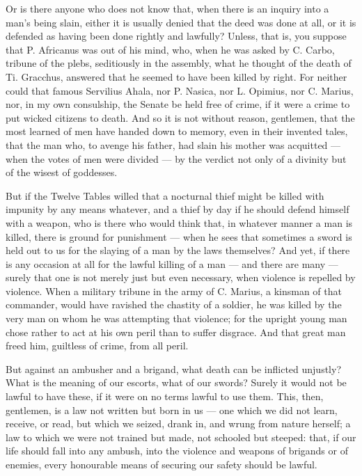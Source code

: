  Or is there anyone who does not know that, when there is an inquiry into a man's being slain, either it is usually denied that the deed was done at all, or it is defended as having been done rightly and lawfully? Unless, that is, you suppose that P. Africanus was out of his mind, who, when he was asked by C. Carbo, tribune of the plebs, seditiously in the assembly, what he thought of the death of Ti. Gracchus, answered that he seemed to have been killed by right. For neither could that famous Servilius Ahala, nor P. Nasica, nor L. Opimius, nor C. Marius, nor, in my own consulship, the Senate be held free of crime, if it were a crime to put wicked citizens to death. And so it is not without reason, gentlemen, that the most learned of men have handed down to memory, even in their invented tales, that the man who, to avenge his father, had slain his mother was acquitted --- when the votes of men were divided --- by the verdict not only of a divinity but of the wisest of goddesses.

 But if the Twelve Tables willed that a nocturnal thief might be killed with impunity by any means whatever, and a thief by day if he should defend himself with a weapon, who is there who would think that, in whatever manner a man is killed, there is ground for punishment --- when he sees that sometimes a sword is held out to us for the slaying of a man by the laws themselves? And yet, if there is any occasion at all for the lawful killing of a man --- and there are many --- surely that one is not merely just but even necessary, when violence is repelled by violence. When a military tribune in the army of C. Marius, a kinsman of that commander, would have ravished the chastity of a soldier, he was killed by the very man on whom he was attempting that violence; for the upright young man chose rather to act at his own peril than to suffer disgrace. And that great man freed him, guiltless of crime, from all peril.

 But against an ambusher and a brigand, what death can be inflicted unjustly? What is the meaning of our escorts, what of our swords? Surely it would not be lawful to have these, if it were on no terms lawful to use them. This, then, gentlemen, is a law not written but born in us --- one which we did not learn, receive, or read, but which we seized, drank in, and wrung from nature herself; a law to which we were not trained but made, not schooled but steeped: that, if our life should fall into any ambush, into the violence and weapons of brigands or of enemies, every honourable means of securing our safety should be lawful.

